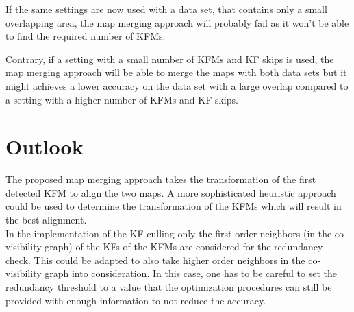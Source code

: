 If the same settings are now used with a data set, that contains only a small overlapping area, the map merging approach will probably fail as it won't be able to find the required number of \acp{KFM}.

Contrary, if a setting with a small number of \acp{KFM} and \ac{KF} skips is used, the map merging approach will be able to merge the maps with both data sets but it might achieves a lower accuracy on the data set with a large overlap compared to a setting with a higher number of \acp{KFM} and \ac{KF} skips.

\section{Outlook}

The proposed map merging approach takes the transformation of the first detected \ac{KFM} to align the two maps. A more sophisticated heuristic approach could be used to determine the transformation of the \acp{KFM} which will result in the best alignment.\\

In the implementation of the \ac{KF} culling only the first order neighbors (in the co-visibility graph) of the \acp{KF} of the \acp{KFM} are considered for the redundancy check. This could be adapted to also take higher order neighbors in the co-visibility graph into consideration. In this case, one has to be careful to set the redundancy threshold to a value that the optimization procedures can still be provided with enough information to not reduce the accuracy.
